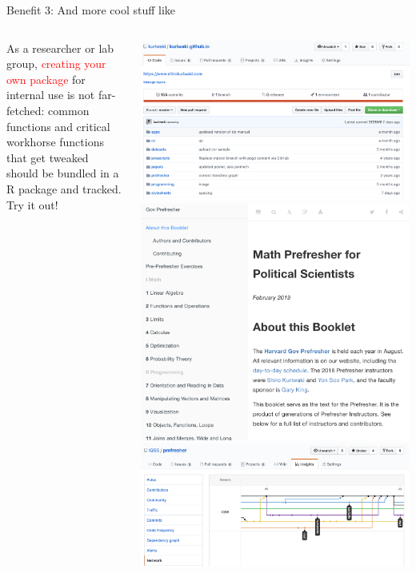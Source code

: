 \documentclass[ignorenonframetext, 10pt, aspectratio=169]{beamer}
\begin{document}
\begin{frame}{Benefit 3: And more cool stuff like}
\begin{columns}[T]
\begin{column}{0.4\textwidth}
{\begin{minipage}{\linewidth}
As a researcher or lab group, \textcolor{red}{creating your own package} for internal use is not far-fetched: common functions and critical workhorse functions that get tweaked should be bundled in a R package and tracked. Try it out!
\end{minipage}
}
\end{column}
\begin{column}{0.6\textwidth}
 {\includegraphics[width = \linewidth]{website-pages.png}}
 {\includegraphics[width = 0.7\linewidth]{prefresher-book.png}}
 {\includegraphics[width = \linewidth]{prefresher-network.png}}

\end{column}
\end{columns}
\end{frame}
\end{document}
